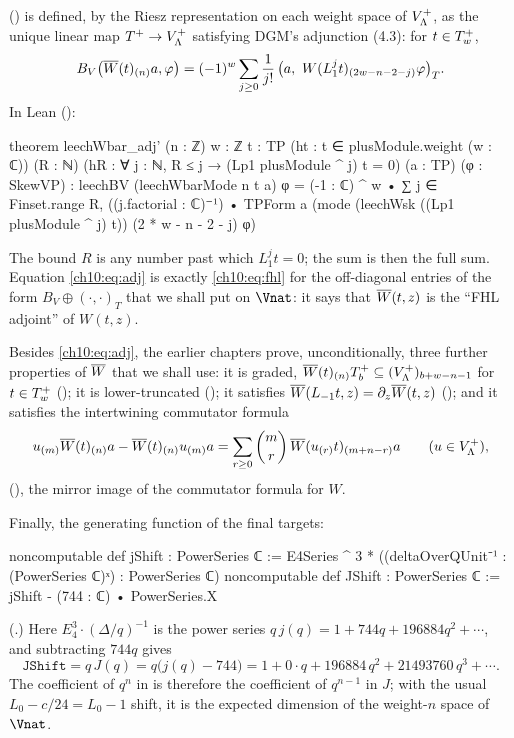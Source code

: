 \begin{itemize}
  () is defined, by the Riesz representation on each weight space of
  $V_{\Lambda}^{+}$, as the unique linear map $T^{+}\to V_{\Lambda}^{+}$ satisfying DGM's adjunction (4.3):
  for $t\in T^{+}_w$,
  \begin{equation}\label{ch10:eq:adj}
    B_V\bigl(\overline{W}(t)_{(n)}a,\varphi\bigr)=(-1)^w\sum_{j\ge0}\frac1{j!}\,
    \bigl(a,\ W(L_1^jt)_{(2w-n-2-j)}\varphi\bigr)_T .
  \end{equation}
  In Lean ():
\begin{leancode}
theorem leechWbar_adj' (n : ℤ) {w : ℤ} {t : TP} (ht : t ∈ plusModule.weight (w : ℂ)) (R : ℕ)
    (hR : ∀ j : ℕ, R ≤ j → (Lp1 plusModule ^ j) t = 0) (a : TP) (φ : SkewVP) :
    leechBV (leechWbarMode n t a) φ = (-1 : ℂ) ^ w • ∑ j ∈ Finset.range R,
      ((j.factorial : ℂ)⁻¹) • TPForm a (mode (leechWsk ((Lp1 plusModule ^ j) t))
        (2 * w - n - 2 - j) φ)
\end{leancode}
  The bound $R$ is any number past which $L_1^jt=0$; the sum is then the full sum.  Equation
  \eqref{ch10:eq:adj} is exactly \eqref{ch10:eq:fhl} for the off-diagonal entries of the form
  $B_V\oplus(\cdot,\cdot)_T$ that we shall put on $\Vnat$: it says that $\overline{W}(t,z)$ is the
  ``FHL adjoint'' of $W(t,z)$.
\end{itemize}

Besides \eqref{ch10:eq:adj}, the earlier chapters prove, unconditionally, three further properties
of $\overline{W}$ that we shall use: it is graded, $\overline{W}(t)_{(n)}T^{+}_b\subseteq
(V_{\Lambda}^{+})_{b+w-n-1}$ for $t\in T^{+}_w$ (); it is lower-truncated
(); it satisfies $\overline{W}(L_{-1}t,z)=\partial_z\overline{W}(t,z)$
(); and it satisfies the intertwining commutator formula
\begin{equation}\label{ch10:eq:wbarcomm}
  u_{(m)}\overline{W}(t)_{(n)}a-\overline{W}(t)_{(n)}u_{(m)}a
  =\sum_{r\ge0}\binom mr\,\overline{W}(u_{(r)}t)_{(m+n-r)}a
  \qquad(u\in V_{\Lambda}^{+}),
\end{equation}
(), the mirror image of the commutator formula for $W$.

Finally, the generating function of the final targets:
\begin{leancode}
noncomputable def jShift : PowerSeries ℂ :=
  E4Series ^ 3 * ((deltaOverQUnit⁻¹ : (PowerSeries ℂ)ˣ) : PowerSeries ℂ)
noncomputable def JShift : PowerSeries ℂ := jShift - (744 : ℂ) • PowerSeries.X
\end{leancode}
(.)  Here $E_4^3\cdot(\Delta/q)^{-1}$ is the power series
$q\,j(q)=1+744q+196884q^2+\cdots$, and subtracting $744q$ gives
\begin{equation*}
  \mathtt{JShift}=q\,J(q)=q\bigl(j(q)-744\bigr)=1+0\cdot q+196884\,q^2+21493760\,q^3+\cdots .
\end{equation*}
The coefficient of $q^n$ in  is therefore the coefficient of $q^{n-1}$ in $J$; with the
usual $L_0-c/24=L_0-1$ shift, it is the expected dimension of the weight-$n$ space of $\Vnat$.

